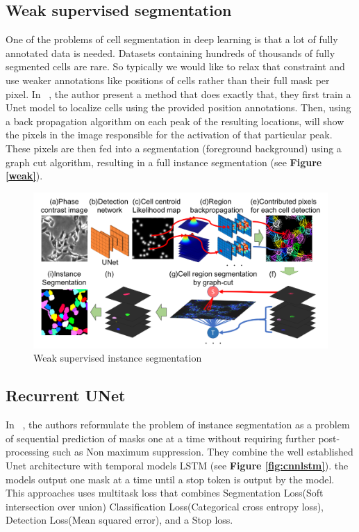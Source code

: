 \documentclass[main.tex]{subfiles}
\begin{document}
\subsection{Weak supervised segmentation} One of the problems of cell segmentation in deep learning is that a lot of fully annotated data is needed. Datasets containing hundreds of thousands of fully segmented cells are rare. So typically we would like to relax that constraint and use weaker annotations like positions of cells rather than their full mask per pixel. In ~\cite{Nishimura2019}, the author present a method that does exactly that, they first train a Unet model to localize cells using the provided position annotations. Then, using a back propagation algorithm on each peak of the resulting locations, will show the pixels in the image responsible for the activation of that particular peak. These pixels are then fed into a segmentation (foreground background) using a graph cut algorithm, resulting in a full instance segmentation (see \textbf{Figure \ref{weak}}).
\begin{figure}
    \centering
    \includegraphics[width=16cm]{images/weak.png}
    \caption{Weak supervised instance segmentation}
    \label{fig:weak}
\end{figure}


\subsection{Recurrent UNet}
In ~\cite{Salvador2017}, the authors reformulate the problem of instance segmentation as a problem of sequential prediction of masks one at a time without requiring further post-processing such as Non maximum suppression. They combine the well established Unet architecture with temporal models LSTM (see \textbf{Figure \ref{fig:cnnlstm}}). the models output one mask at a time until a stop token is output by the model. This approaches uses multitask loss that combines Segmentation Loss(Soft intersection over union)
Classification Loss(Categorical cross entropy loss), Detection Loss(Mean squared error), and a Stop loss.
\end{document}
